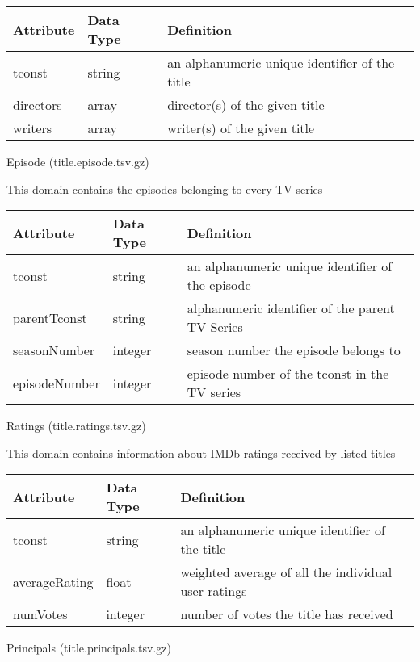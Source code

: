 \documentclass[10pt,titlepage]{article}
\begin{document}
\begin{center}
\begin{tabular}{|l|l|l|}
\hline
Attribute & Data Type & Definition \\
\hline
tconst & string & an alphanumeric unique identifier of the title \\
\hline
directors & array & director(s) of the given title \\
\hline
writers & array & writer(s) of the given title \\
\hline
\end{tabular}
\end{center}

Episode (title.episode.tsv.gz)

This domain contains the episodes belonging to every TV series

\begin{center}
\begin{tabular}{|l|l|l|}
\hline
Attribute & Data Type & Definition \\
\hline
tconst & string & an alphanumeric unique identifier of the episode \\
\hline
parentTconst & string & alphanumeric identifier of the parent TV Series \\
\hline
seasonNumber & integer & season number the episode belongs to \\
\hline
episodeNumber & integer & episode number of the tconst in the TV series \\
\hline
\end{tabular}
\end{center}

Ratings (title.ratings.tsv.gz)

This domain contains information about IMDb ratings received by listed titles

\begin{center}
\begin{tabular}{|l|l|l|}
\hline
Attribute & Data Type & Definition \\
\hline
tconst & string & an alphanumeric unique identifier of the title \\
\hline
averageRating & float & weighted average of all the individual user ratings \\
\hline
numVotes & integer & number of votes the title has received \\
\hline
\end{tabular}
\end{center}

Principals (title.principals.tsv.gz)
\end{document}
